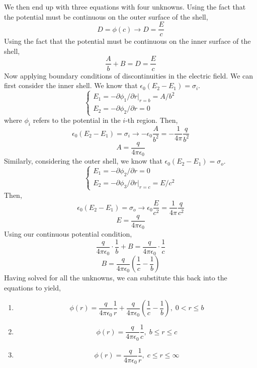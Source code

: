 \documentclass[12pt]{article}
\begin{document}
\begin{enumerate}
\begin{enumerate}
\begin{enumerate}
		\end{enumerate}
		We then end up with three equations with four unknowns.
		Using the fact that the potential must be continuous on the outer surface of the shell,
		\[D = \phi(c)\to D = \frac{E}{c}\]
		Using the fact that the potential must be continuous on the inner surface of the shell,
		\[\frac{A}{b}+B=D=\frac{E}{c}\]
		Now applying boundary conditions of discontinuities in the electric field.
		We can first consider the inner shell.
		We know that $\epsilon_0(E_2-E_1)=\sigma_i$.
		\[\begin{cases}
			E_1 = -\partial \phi_1/\partial r|_{r=b} = A/b^2 \\
			E_2 = -\partial \phi_2/\partial r = 0
		\end{cases}\]
		where $\phi_i$ refers to the potential in the $i$-th region.
		Then,
		\[\epsilon_0(E_2-E_1)=\sigma_i \to -\epsilon_0\frac{A}{b^2}=-\frac{1}{4\pi}\frac{q}{b^2}\]
		\[A=\frac{q}{4\pi \epsilon_0}\]
		Similarly, considering the outer shell, we know that $\epsilon_0(E_2-E_1)=\sigma_o$.
		\[\begin{cases}
			E_1 = -\partial \phi_2/\partial r= 0 \\	
			E_2 = -\partial \phi_3/\partial r|_{r=c} = E/c^2
		\end{cases}\]
		Then,
		\[\epsilon_0(E_2-E_1)=\sigma_o \to \epsilon_0\frac{E}{c^2}=\frac{1}{4\pi}\frac{q}{c^2}\]
		\[E = \frac{q}{4\pi\epsilon_0}\]
		Using our continuous potential condition,
		\[\frac{q}{4\pi\epsilon_0}\cdot \frac{1}{b} + B = \frac{q}{4\pi\epsilon_0}\cdot \frac{1}{c}\]
		\[B = \frac{q}{4\pi\epsilon_0}\left(\frac{1}{c}-\frac{1}{b}\right)\]
		Having solved for all the unknowns, we can substitute this back into the equations to yield,
		\begin{enumerate}
			\item [i.]
			\[\boxed{\phi(r)= \frac{q}{4\pi\epsilon_0}\frac{1}{r}+\frac{q}{4\pi\epsilon_0}\left(\frac{1}{c}-\frac{1}{b}\right), \; 0<r\leq b}\]

			\item [ii.]
			\[\boxed{\phi(r)=\frac{q}{4\pi\epsilon_0}\frac{1}{c}, \; b\leq r\leq c}\]

			\item [iii.]
			\[\boxed{\phi(r)=\frac{q}{4\pi\epsilon_0}\frac{1}{r}, \; c\leq r \leq \infty}\]
		\end{enumerate}


\end{enumerate}
\end{enumerate}
\end{document}
